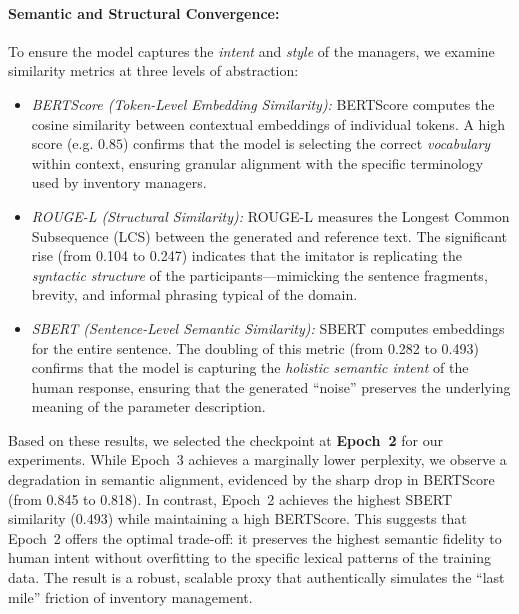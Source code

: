 \documentclass[mnsc,nonblindrev]{informs3_hide}
\begin{document}
\paragraph{Semantic and Structural Convergence:}
To ensure the model captures the \emph{intent} and \emph{style} of the managers, we examine similarity metrics at three levels of abstraction:
\begin{itemize}
    \item \emph{BERTScore (Token-Level Embedding Similarity):} BERTScore computes the cosine similarity between contextual embeddings of individual tokens. A high score (e.g. $0.85$) confirms that the model is selecting the correct \emph{vocabulary} within context, ensuring granular alignment with the specific terminology used by inventory managers.
    \item \emph{ROUGE-L (Structural Similarity):} ROUGE-L measures the Longest Common Subsequence (LCS) between the generated and reference text. The significant rise (from 0.104 to 0.247) indicates that the imitator is replicating the \emph{syntactic structure} of the participants—mimicking the sentence fragments, brevity, and informal phrasing typical of the domain.
    \item \emph{SBERT (Sentence-Level Semantic Similarity):} SBERT computes embeddings for the entire sentence. The doubling of this metric (from 0.282 to 0.493) confirms that the model is capturing the \emph{holistic semantic intent} of the human response, ensuring that the generated ``noise'' preserves the underlying meaning of the parameter description.
\end{itemize}

Based on these results, we selected the checkpoint at \textbf{Epoch~2} for our experiments. While Epoch~3 achieves a marginally lower perplexity, we observe a degradation in semantic alignment, evidenced by the sharp drop in BERTScore (from 0.845 to 0.818). In contrast, Epoch~2 achieves the highest SBERT similarity ($0.493$) while maintaining a high BERTScore. This suggests that Epoch~2 offers the optimal trade-off: it preserves the highest semantic fidelity to human intent without overfitting to the specific lexical patterns of the training data. The result is a robust, scalable proxy that authentically simulates the ``last mile'' friction of inventory management.




\end{document}

